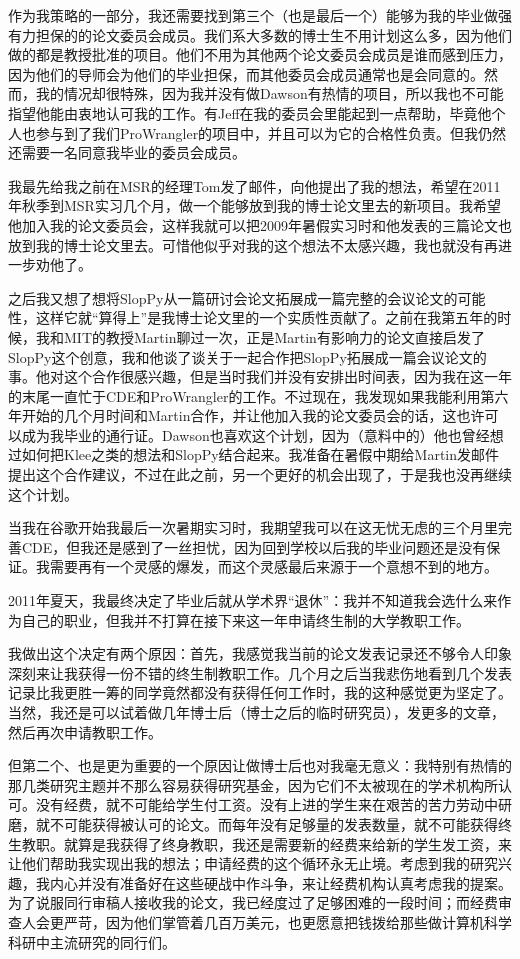 \documentclass[12pt,UTF8,nofonts]{book}
\begin{document}
作为我策略的一部分，我还需要找到第三个（也是最后一个）能够为我的毕业做强有力担保的的论文委员会成员。我们系大多数的博士生不用计划这么多，因为他们做的都是教授批准的项目。他们不用为其他两个论文委员会成员是谁而感到压力，因为他们的导师会为他们的毕业担保，而其他委员会成员通常也是会同意的。然而，我的情况却很特殊，因为我并没有做Dawson有热情的项目，所以我也不可能指望他能由衷地认可我的工作。有Jeff在我的委员会里能起到一点帮助，毕竟他个人也参与到了我们ProWrangler的项目中，并且可以为它的合格性负责。但我仍然还需要一名同意我毕业的委员会成员。

我最先给我之前在MSR的经理Tom发了邮件，向他提出了我的想法，希望在2011年秋季到MSR实习几个月，做一个能够放到我的博士论文里去的新项目。我希望他加入我的论文委员会，这样我就可以把2009年暑假实习时和他发表的三篇论文也放到我的博士论文里去。可惜他似乎对我的这个想法不太感兴趣，我也就没有再进一步劝他了。

之后我又想了想将SlopPy从一篇研讨会论文拓展成一篇完整的会议论文的可能性，这样它就“算得上”是我博士论文里的一个实质性贡献了。之前在我第五年的时候，我和MIT的教授Martin聊过一次，正是Martin有影响力的论文直接启发了SlopPy这个创意，我和他谈了谈关于一起合作把SlopPy拓展成一篇会议论文的事。他对这个合作很感兴趣，但是当时我们并没有安排出时间表，因为我在这一年的末尾一直忙于CDE和ProWrangler的工作。不过现在，我发现如果我能利用第六年开始的几个月时间和Martin合作，并让他加入我的论文委员会的话，这也许可以成为我毕业的通行证。Dawson也喜欢这个计划，因为（意料中的）他也曾经想过如何把Klee之类的想法和SlopPy结合起来。我准备在暑假中期给Martin发邮件提出这个合作建议，不过在此之前，另一个更好的机会出现了，于是我也没再继续这个计划。

当我在谷歌开始我最后一次暑期实习时，我期望我可以在这无忧无虑的三个月里完善CDE，但我还是感到了一丝担忧，因为回到学校以后我的毕业问题还是没有保证。我需要再有一个灵感的爆发，而这个灵感最后来源于一个意想不到的地方。

\breakline

2011年夏天，我最终决定了毕业后就从学术界“退休”：我并不知道我会选什么来作为自己的职业，但我并不打算在接下来这一年申请终生制的大学教职工作。

我做出这个决定有两个原因：首先，我感觉我当前的论文发表记录还不够令人印象深刻来让我获得一份不错的终生制教职工作。几个月之后当我悲伤地看到几个发表记录比我更胜一筹的同学竟然都没有获得任何工作时，我的这种感觉更为坚定了。当然，我还是可以试着做几年博士后（博士之后的临时研究员），发更多的文章，然后再次申请教职工作。

但第二个、也是更为重要的一个原因让做博士后也对我毫无意义：我特别有热情的那几类研究主题并不那么容易获得研究基金，因为它们不太被现在的学术机构所认可。没有经费，就不可能给学生付工资。没有上进的学生来在艰苦的苦力劳动中研磨，就不可能获得被认可的论文。而每年没有足够量的发表数量，就不可能获得终生教职。就算是我获得了终身教职，我还是需要新的经费来给新的学生发工资，来让他们帮助我实现出我的想法；申请经费的这个循环永无止境。考虑到我的研究兴趣，我内心并没有准备好在这些硬战中作斗争，来让经费机构认真考虑我的提案。为了说服同行审稿人接收我的论文，我已经度过了足够困难的一段时间；而经费审查人会更严苛，因为他们掌管着几百万美元，也更愿意把钱拨给那些做计算机科学科研中主流研究的同行们。
\end{document}
